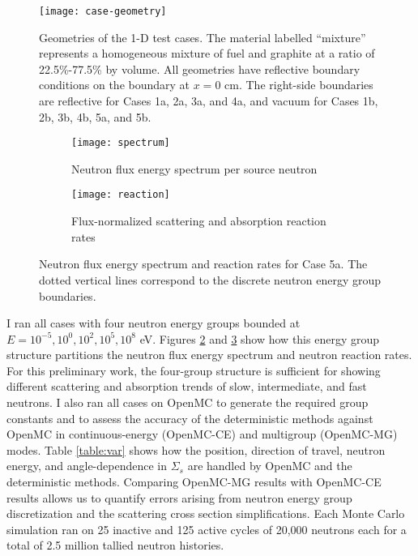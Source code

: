 \begin{figure}[htb!]
  \centering
  \texttt{[image: case-geometry]}
  \caption{Geometries of the 1-D test cases. The material labelled ``mixture'' represents a
    homogeneous mixture of fuel and graphite at a ratio of 22.5\%-77.5\% by volume. All geometries
    have reflective boundary conditions on the boundary at $x=0$ cm. The right-side boundaries are
    reflective for Cases 1a, 2a, 3a, and 4a, and vacuum for Cases 1b, 2b, 3b, 4b, 5a, and 5b.}
  \label{fig:case-geom}
\end{figure}
%
\begin{figure}[htb!]
  \centering
  \begin{subfigure}[t]{.49\textwidth}
    \centering
    \texttt{[image: spectrum]}
    \caption{Neutron flux energy spectrum per source neutron}
    \label{fig:spectrum}
  \end{subfigure}
  \hfill
  \begin{subfigure}[t]{.49\textwidth}
    \centering
    \texttt{[image: reaction]}
    \caption{Flux-normalized scattering and absorption reaction rates}
    \label{fig:reaction}
  \end{subfigure}
  \caption{Neutron flux energy spectrum and reaction rates for Case 5a. The dotted vertical lines
  correspond to the discrete neutron energy group boundaries.}
  \label{fig:spec-reac}
\end{figure}
%

I ran all cases with four neutron energy groups bounded at $E=10^{-5}, 10^0, 10^2, 10^5, 10^8$
eV. Figures \ref{fig:spectrum} and \ref{fig:reaction} show how this energy group structure
partitions the neutron flux energy spectrum and neutron reaction rates. For this preliminary work,
the four-group structure is sufficient for showing different scattering and absorption trends of
slow, intermediate, and fast neutrons. I also ran all cases on OpenMC to generate the required
group constants and to assess the accuracy of the deterministic methods against OpenMC in
continuous-energy (OpenMC-CE) and multigroup (OpenMC-MG) modes. Table \ref{table:var} shows how the
position, direction of travel, neutron energy, and angle-dependence in $\Sigma_s$ are handled by
OpenMC and the deterministic methods. Comparing OpenMC-MG results with OpenMC-CE results allows us
to quantify errors arising from neutron energy group discretization and the scattering cross
section simplifications. Each Monte Carlo simulation ran on 25 inactive and 125 active cycles of
20,000 neutrons each for a total of 2.5 million tallied neutron histories.

